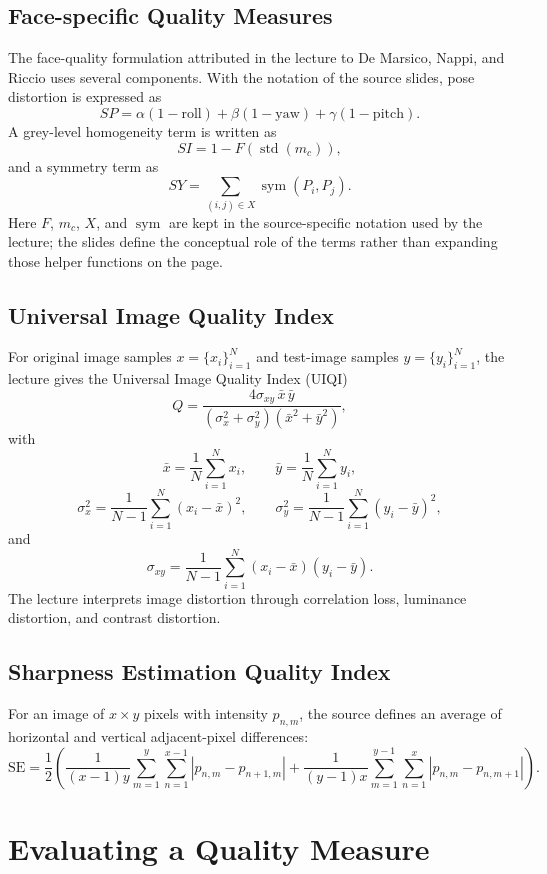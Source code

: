 \documentclass[11pt,a4paper,oneside]{report}
\begin{document}
\subsection{Face-specific Quality Measures}

The face-quality formulation attributed in the lecture to De Marsico, Nappi,
and Riccio uses several components.  With the notation of the source slides,
pose distortion is expressed as
\[
    SP=\alpha(1-\mathrm{roll})
      +\beta(1-\mathrm{yaw})
      +\gamma(1-\mathrm{pitch}).
\]
A grey-level homogeneity term is written as
\[
    SI=1-F\!\left(\operatorname{std}(m_c)\right),
\]
and a symmetry term as
\[
    SY=\sum_{(i,j)\in X}\operatorname{sym}(P_i,P_j).
\]
Here $F$, $m_c$, $X$, and $\operatorname{sym}$ are kept in the source-specific
notation used by the lecture; the slides define the conceptual role of the
terms rather than expanding those helper functions on the page.

\subsection{Universal Image Quality Index}

For original image samples $x=\{x_i\}_{i=1}^{N}$ and test-image samples
$y=\{y_i\}_{i=1}^{N}$, the lecture gives the Universal Image Quality Index
(UIQI)
\[
Q=\frac{4\sigma_{xy}\,\bar{x}\,\bar{y}}
        {(\sigma_x^2+\sigma_y^2)(\bar{x}^{2}+\bar{y}^{2})},
\]
with
\[
\bar{x}=\frac{1}{N}\sum_{i=1}^{N}x_i,
\qquad
\bar{y}=\frac{1}{N}\sum_{i=1}^{N}y_i,
\]
\[
\sigma_x^2=\frac{1}{N-1}\sum_{i=1}^{N}(x_i-\bar{x})^2,
\qquad
\sigma_y^2=\frac{1}{N-1}\sum_{i=1}^{N}(y_i-\bar{y})^2,
\]
and
\[
\sigma_{xy}=\frac{1}{N-1}\sum_{i=1}^{N}(x_i-\bar{x})(y_i-\bar{y}).
\]
The lecture interprets image distortion through correlation loss, luminance
distortion, and contrast distortion.

\subsection{Sharpness Estimation Quality Index}

For an image of $x\times y$ pixels with intensity $p_{n,m}$, the source defines
an average of horizontal and vertical adjacent-pixel differences:
\[
\mathrm{SE}=\frac{1}{2}\left(
\frac{1}{(x-1)y}\sum_{m=1}^{y}\sum_{n=1}^{x-1}
\left|p_{n,m}-p_{n+1,m}\right|
+
\frac{1}{(y-1)x}\sum_{m=1}^{y-1}\sum_{n=1}^{x}
\left|p_{n,m}-p_{n,m+1}\right|
\right).
\]

\section{Evaluating a Quality Measure}
\label{sec:evaluating-quality-measure}
\end{document}
